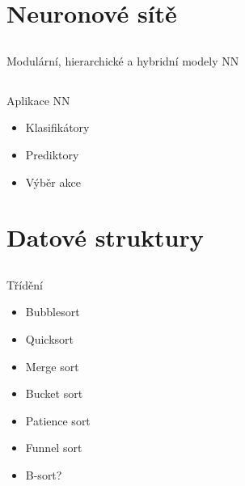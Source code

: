 \documentclass{beamer}
\begin{document}
\section{Neuronové sítě}

\subsection{}
\begin{frame}{Modulární, hierarchické a hybridní modely NN}
\end{frame}

\subsection{}
\begin{frame}{Aplikace NN}
\begin{itemize}
\item Klasifikátory
\item Prediktory
\item Výběr akce
\end{itemize}
\end{frame}

\subsection{}

\section{Datové struktury}

\subsection{}
\begin{frame}{Třídění}
\begin{itemize}
\item Bubblesort
\item Quicksort
\item Merge sort
\item Bucket sort
\item Patience sort
\item Funnel sort
\item B-sort?
\end{itemize}
\end{frame}
\end{document}
